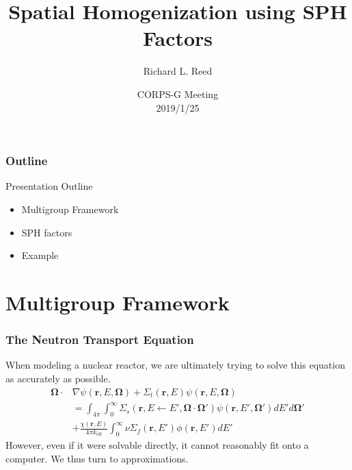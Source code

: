 \documentclass[fleqn]{beamer}
\title[SPH Demo]{
    Spatial Homogenization using SPH Factors}
\author[Reed]{
    Richard L. Reed}
\institute[Kansas State University]{
    Mechanical and Nuclear Engineering \\
    Kansas State University}
\date[CORPS-G Meeting]{
    CORPS-G Meeting \\
    2019/1/25}
\renewcommand{\vec}[1]{\ensuremath{\bm{#1}}}
\begin{document}
    \begin{frame}
        \titlepage
    \end{frame}

    \begin{frame}
        \frametitle{Outline}
        \begin{block}{Presentation Outline}
            \begin{itemize}
                \item Multigroup Framework
                \item SPH factors
                \item Example
            \end{itemize}
        \end{block}
    \end{frame}

    \section{Multigroup Framework}

    \begin{frame}
        \frametitle{The Neutron Transport Equation}
        \centering
        \begin{block}{}
            When modeling a nuclear reactor, we are ultimately trying to solve this equation as accurately as possible.
            \begin{align*}
                \vec{\Omega}\cdot&\nabla\psi(\vec{r},E,\vec{\Omega})
                +\Sigma_t(\vec{r},E)\psi(\vec{r},E,\vec{\Omega})\\
                &=\int_{4\pi}\int_0^\infty\Sigma_s(\vec{r},E\leftarrow E',\vec{\Omega}\cdot\vec{\Omega}')\psi(\vec{r},E',\vec{\Omega'})dE'd\vec{\Omega}'\\
                &+\frac{\chi(\vec{r},E)}{4\pi k_{\text{eff}}}\int_0^\infty\nu\Sigma_f(\vec{r},E')\phi(\vec{r},E')dE'
            \end{align*}
            However, even if it were solvable directly, it cannot reasonably fit onto a computer.
            We thus turn to approximations.
        \end{block}
    \end{frame}
\end{document}
